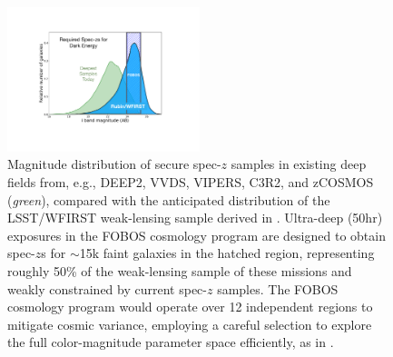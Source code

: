 \documentclass[11pt,a4paper,twoside,onecolumn,openany,final,oldfontcommands]{memoir}
\begin{document}
\begin{figure}%
\vspace{-0.2cm}
\includegraphics[width=0.5\textwidth]{figs/fobos_cosmology_v2.pdf}
\caption{\footnotesize Magnitude distribution of secure spec-$z$ samples in existing deep fields from, e.g., DEEP2, VVDS, VIPERS, C3R2, and zCOSMOS ({\it green}), compared with the anticipated distribution of the LSST/WFIRST weak-lensing sample derived in \citet[][{\it blue}]{hemmati18}. Ultra-deep (50hr) exposures in the FOBOS cosmology program are designed to obtain spec-$z$s for $\sim$15k faint galaxies in the hatched region, representing roughly 50\% of the weak-lensing sample of these missions and weakly constrained by current spec-$z$ samples. The FOBOS cosmology program would operate over 12 independent regions to mitigate cosmic variance, employing a careful selection to explore the full color-magnitude parameter space efficiently, as in \cite{masters15}. }
\label{fig:cosmos_magdist}
\end{figure}
\end{document}
